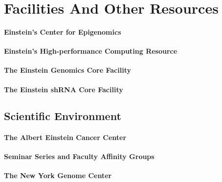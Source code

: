 

\section{Facilities And Other Resources}

\paragraph{Einstein's Center for Epigenomics} \lipsum[1-1]
\paragraph{Einstein's High-performance Computing Resource} \lipsum[2-2]
\paragraph{The Einstein Genomics Core Facility} \lipsum[3-3]
\paragraph{The Einstein shRNA Core Facility} \lipsum[4-4]

\subsection{Scientific Environment}
\paragraph{The Albert Einstein Cancer Center} \lipsum[5-6]
\paragraph{Seminar Series and Faculty Affinity Groups} \lipsum[7-7]
\paragraph{The New York Genome Center} \lipsum[7-10]